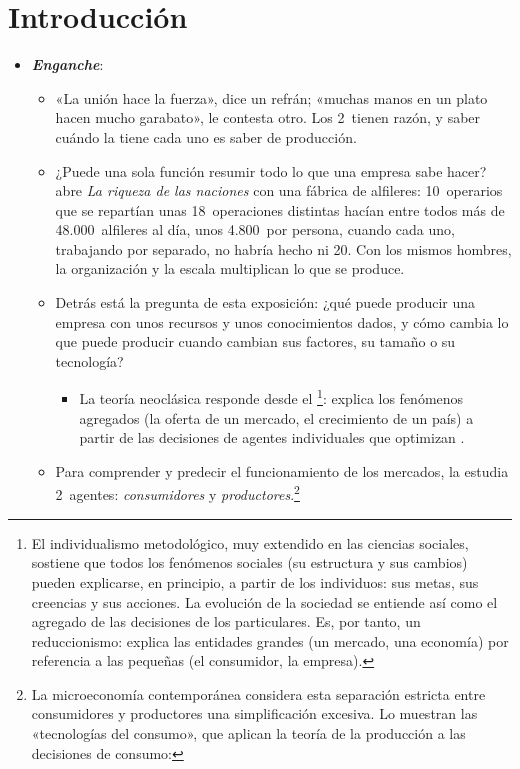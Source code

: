 \documentclass[11pt]{article}
\begin{document}
\tceetitulo

\section*{Introducción}

\begin{itemize}
\item \textbf{\emph{Enganche}}:
  \begin{itemize}
  \item «La unión hace la fuerza», dice un refrán; «muchas manos en un plato hacen mucho garabato», le contesta otro. Los 2~tienen razón, y saber cuándo la tiene cada uno es saber de producción.
  \item ¿Puede una sola función resumir todo lo que una empresa sabe hacer? \textcite[libro~I, cap.~I]{Smith1776Wealth} abre \emph{La riqueza de las naciones} con una fábrica de alfileres: 10~operarios que se repartían unas 18~operaciones distintas hacían entre todos más de 48.000~alfileres al día, unos 4.800~por persona, cuando cada uno, trabajando por separado, no habría hecho ni 20. Con los mismos hombres, la organización y la escala multiplican lo que se produce.
  \item Detrás está la pregunta de esta exposición: ¿qué puede producir una empresa con unos recursos y unos conocimientos dados, y cómo cambia lo que puede producir cuando cambian sus factores, su tamaño o su tecnología?
    \begin{itemize}
    \item La teoría neoclásica responde desde el \footnote{El individualismo metodológico, muy extendido en las ciencias sociales, sostiene que todos los fenómenos sociales (su estructura y sus cambios) pueden explicarse, en principio, a partir de los individuos: sus metas, sus creencias y sus acciones. La evolución de la sociedad se entiende así como el agregado de las decisiones de los particulares. Es, por tanto, un reduccionismo: explica las entidades grandes (un mercado, una economía) por referencia a las pequeñas (el consumidor, la empresa).}: explica los fenómenos agregados (la oferta de un mercado, el crecimiento de un país) a partir de las decisiones de agentes individuales que optimizan .
    \end{itemize}
  \item Para comprender y predecir el funcionamiento de los mercados, la  estudia 2~agentes: \emph{consumidores} y \emph{productores}.\footnote{La microeconomía contemporánea considera esta separación estricta entre consumidores y productores una simplificación excesiva\nocite{EkelundHebert2013History}. Lo muestran las «tecnologías del consumo», que aplican la teoría de la producción a las decisiones de consumo:
}
\end{itemize}
\end{itemize}
\end{document}
